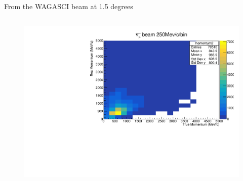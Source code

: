 \documentclass[11pt]{beamer}
\begin{document}
\begin{frame}{From the WAGASCI beam at 1.5 degrees}
\begin{columns}[T] %
	\begin{column}{.48\textwidth}
		
		\begin{figure}[h!]
			\centering
			\includegraphics[width=.9\textwidth]{T2K/MomentumT2KAntiNeutrinoBeamMIND.pdf}
			

\end{figure}
\end{column}
\end{columns}
\end{frame}
\end{document}

